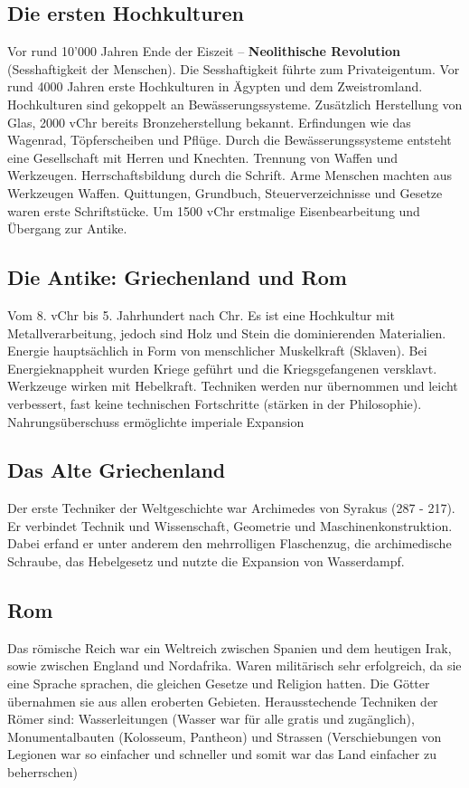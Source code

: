 \documentclass[10pt, openright=true]{scrartcl}
\begin{document}
\subsection{Die ersten Hochkulturen}
Vor rund 10’000 Jahren Ende der Eiszeit – \textbf{Neolithische Revolution} (Sesshaftigkeit der Menschen). Die Sesshaftigkeit führte zum Privateigentum.
Vor rund 4000 Jahren erste Hochkulturen in Ägypten und dem Zweistromland. Hochkulturen sind gekoppelt an Bewässerungssysteme. Zusätzlich Herstellung von Glas, 2000 vChr bereits Bronzeherstellung bekannt. Erfindungen wie das Wagenrad, Töpferscheiben und Pflüge. Durch die Bewässerungssysteme entsteht eine Gesellschaft mit Herren und Knechten. Trennung von
Waffen und Werkzeugen. Herrschaftsbildung durch die Schrift. Arme Menschen machten aus Werkzeugen Waffen. Quittungen, Grundbuch, Steuerverzeichnisse und Gesetze waren erste Schriftstücke. Um 1500 vChr erstmalige Eisenbearbeitung und Übergang zur Antike.
\subsection{Die Antike: Griechenland und Rom}
Vom 8. vChr bis 5. Jahrhundert nach Chr. Es ist eine Hochkultur mit Metallverarbeitung, jedoch sind Holz und Stein die dominierenden Materialien. Energie hauptsächlich in Form von menschlicher Muskelkraft (Sklaven). Bei Energieknappheit wurden Kriege geführt und die Kriegsgefangenen versklavt. Werkzeuge wirken mit Hebelkraft. Techniken werden nur übernommen und leicht verbessert, fast keine technischen Fortschritte (stärken in der Philosophie). Nahrungsüberschuss ermöglichte imperiale Expansion
\subsection{Das Alte Griechenland}
Der erste Techniker der Weltgeschichte war Archimedes von Syrakus (287 - 217). Er verbindet Technik und Wissenschaft, Geometrie und Maschinenkonstruktion. Dabei erfand er unter anderem den mehrrolligen Flaschenzug, die archimedische Schraube, das Hebelgesetz und nutzte die Expansion von Wasserdampf.
\subsection{Rom}
Das römische Reich war ein Weltreich zwischen Spanien und dem heutigen Irak, sowie zwischen England und Nordafrika. Waren militärisch sehr erfolgreich, da sie eine Sprache sprachen, die gleichen Gesetze und Religion hatten. Die Götter übernahmen sie aus allen eroberten Gebieten. Herausstechende Techniken der Römer sind: Wasserleitungen (Wasser war für alle gratis und zugänglich), Monumentalbauten (Kolosseum, Pantheon) und Strassen (Verschiebungen von Legionen war so einfacher und schneller und somit war das Land einfacher zu beherrschen)
\end{document}
